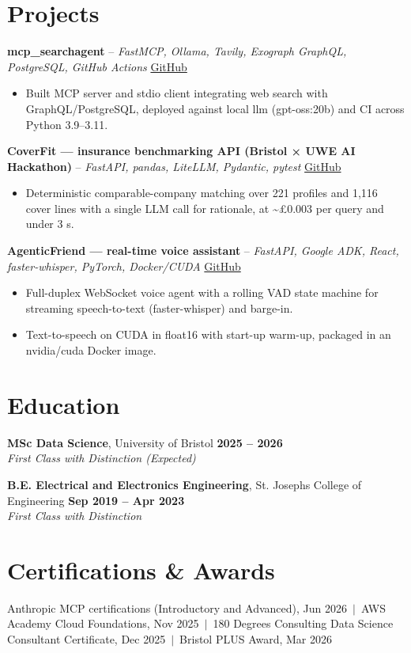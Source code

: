\documentclass[a4paper,11pt]{article}
\begin{document}
\section{Projects}
\noindent\textbf{mcp\_searchagent} -- \textit{FastMCP, Ollama, Tavily, Exograph GraphQL, PostgreSQL, GitHub Actions} \hfill \href{https://github.com/Thiruvel-AP/mcp_searchagent}{GitHub}
\begin{itemize}
  \item Built MCP server and stdio client integrating web search with GraphQL/PostgreSQL, deployed against local llm (gpt-oss:20b) and CI across Python 3.9–3.11.
\end{itemize}
\vspace{3pt}
\noindent\textbf{CoverFit — insurance benchmarking API (Bristol × UWE AI Hackathon)} -- \textit{FastAPI, pandas, LiteLLM, Pydantic, pytest} \hfill \href{https://github.com/Thiruvel-AP/AIHackathon-Phoenix}{GitHub}
\begin{itemize}
  \item Deterministic comparable-company matching over 221 profiles and 1,116 cover lines with a single LLM call for rationale, at \textasciitilde{}£0.003 per query and under 3 s.
\end{itemize}
\vspace{3pt}
\noindent\textbf{AgenticFriend — real-time voice assistant} -- \textit{FastAPI, Google ADK, React, faster-whisper, PyTorch, Docker/CUDA} \hfill \href{https://github.com/Thiruvel-AP/adk_multi-agent}{GitHub}
\begin{itemize}
  \item Full-duplex WebSocket voice agent with a rolling VAD state machine for streaming speech-to-text (faster-whisper) and barge-in.
  \item Text-to-speech on CUDA in float16 with start-up warm-up, packaged in an nvidia/cuda Docker image.
\end{itemize}

\section{Education}
\textbf{MSc Data Science}, University of Bristol \hfill \textbf{2025 – 2026}\\ \textit{First Class with Distinction (Expected)}\par
\vspace{3pt}
\textbf{B.E. Electrical and Electronics Engineering}, St. Joseph\textquotesingle{}s College of Engineering \hfill \textbf{Sep 2019 – Apr 2023}\\ \textit{First Class with Distinction}\par

\section{Certifications \& Awards}
Anthropic MCP certifications (Introductory and Advanced), Jun 2026 \,$|$\, AWS Academy Cloud Foundations, Nov 2025 \,$|$\, 180 Degrees Consulting Data Science Consultant Certificate, Dec 2025 \,$|$\, Bristol PLUS Award, Mar 2026
\end{document}

